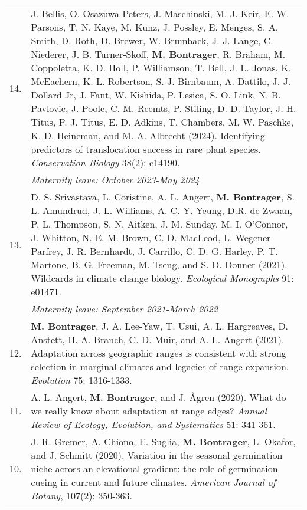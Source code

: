 \documentclass[letterpaper,11pt,oneside]{article}
\begin{document}
\def\arraystretch{1.4}
\noindent \begin{tabular}{@{} p{0.5cm} >{\raggedright\arraybackslash}p{16.7cm}}
14. & J. Bellis, O. Osazuwa‐Peters, J. Maschinski, M. J. Keir, E. W. Parsons, T. N. Kaye, M. Kunz, J. Possley, E. Menges, S. A. Smith, D. Roth, D. Brewer, W. Brumback, J. J. Lange, C. Niederer, J. B. Turner‐Skoff, \textbf{M. Bontrager}, R. Braham, M. Coppoletta, K. D. Holl, P. Williamson, T. Bell, J. L. Jonas, K. McEachern, K. L. Robertson, S. J. Birnbaum, A. Dattilo, J. J. Dollard Jr, J. Fant, W. Kishida, P. Lesica, S. O. Link, N. B. Pavlovic, J. Poole, C. M. Reemts, P. Stiling, D. D. Taylor, J. H. Titus, P. J. Titus, E. D. Adkins, T. Chambers, M. W. Paschke, K. D. Heineman, and M. A. Albrecht (2024). Identifying predictors of translocation success in rare plant species. \textit{Conservation Biology} 38(2): e14190. \\
& \textit{Maternity leave: October 2023-May 2024} \\
13. & D. S. Srivastava, L. Coristine, A. L. Angert, \textbf{M. Bontrager}, S. L. Amundrud, J. L. Williams, A. C. Y. Yeung, D.R. de Zwaan, P. L. Thompson, S. N. Aitken, J. M. Sunday, M. I. O'Connor, J. Whitton, N. E. M. Brown, C. D. MacLeod, L. Wegener Parfrey, J. R. Bernhardt, J. Carrillo, C. D. G. Harley, P. T. Martone, B. G. Freeman, M. Tseng, and S. D. Donner (2021). Wildcards in climate change biology. \textit{Ecological Monographs} 91: e01471. \\ 
& \textit{Maternity leave: September 2021-March 2022} \\
12. & \textbf{M. Bontrager}, J. A. Lee-Yaw, T. Usui, A. L. Hargreaves, D. Anstett, H. A. Branch, C. D. Muir, and A. L. Angert (2021). Adaptation across geographic ranges is consistent with strong selection in marginal climates and legacies of range expansion. \textit{Evolution} 75: 1316-1333. \\
11. & A. L. Angert, \textbf{M. Bontrager}, and J. \AA gren (2020). What do we really know about adaptation at range edges? \textit{Annual Review of Ecology, Evolution, and Systematics} 51: 341-361. \\
10. & J. R. Gremer, A. Chiono, E. Suglia, \textbf{M. Bontrager}, L. Okafor, and J. Schmitt (2020). Variation in the seasonal germination niche across an elevational gradient: the role of germination cueing in current and future climates. \textit{American Journal of Botany}, 107(2): 350-363. \\
\end{tabular}
\end{document}
